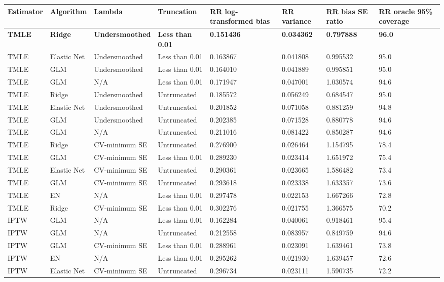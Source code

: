 
\begin{longtable}[l]{llllllll}
\toprule
Estimator & Algorithm & Lambda & Truncation & RR log-transformed bias & RR variance & RR bias SE ratio & RR oracle 95\% coverage\\
\midrule
\midrule
\textbf{TMLE} & \textbf{Ridge} & \textbf{Undersmoothed} & \textbf{Less than 0.01} & \textbf{0.151436} & \textbf{0.034362} & \textbf{0.797888} & \textbf{96.0}\\
\midrule
TMLE & Elastic Net & Undersmoothed & Less than 0.01 & 0.163867 & 0.041808 & 0.995532 & 95.0\\
TMLE & GLM & Undersmoothed & Less than 0.01 & 0.164010 & 0.041889 & 0.995851 & 95.0\\
TMLE & GLM & N/A & Less than 0.01 & 0.171947 & 0.047001 & 1.030574 & 94.6\\
TMLE & Ridge & Undersmoothed & Untruncated & 0.185572 & 0.056249 & 0.684547 & 95.0\\
TMLE & Elastic Net & Undersmoothed & Untruncated & 0.201852 & 0.071058 & 0.881259 & 94.8\\
TMLE & GLM & Undersmoothed & Untruncated & 0.202385 & 0.071528 & 0.880778 & 94.6\\
TMLE & GLM & N/A & Untruncated & 0.211016 & 0.081422 & 0.850287 & 94.6\\
TMLE & Ridge & CV-minimum SE & Untruncated & 0.276900 & 0.026464 & 1.154795 & 78.4\\
TMLE & GLM & CV-minimum SE & Less than 0.01 & 0.289230 & 0.023414 & 1.651972 & 75.4\\
TMLE & Elastic Net & CV-minimum SE & Untruncated & 0.290361 & 0.023665 & 1.586482 & 73.4\\
TMLE & GLM & CV-minimum SE & Untruncated & 0.293618 & 0.023338 & 1.633357 & 73.6\\
TMLE & EN & N/A & Less than 0.01 & 0.297478 & 0.022153 & 1.667266 & 72.8\\
TMLE & Ridge & CV-minimum SE & Less than 0.01 & 0.302276 & 0.021755 & 1.366575 & 70.2\\
IPTW & GLM & N/A & Less than 0.01 & 0.162284 & 0.040061 & 0.918461 & 95.4\\
IPTW & GLM & N/A & Untruncated & 0.212558 & 0.083957 & 0.849759 & 94.6\\
IPTW & GLM & CV-minimum SE & Less than 0.01 & 0.288961 & 0.023091 & 1.639461 & 73.8\\
IPTW & EN & N/A & Less than 0.01 & 0.295262 & 0.021930 & 1.639457 & 72.6\\
IPTW & Elastic Net & CV-minimum SE & Untruncated & 0.296734 & 0.023111 & 1.590735 & 72.2\\

\end{longtable}
